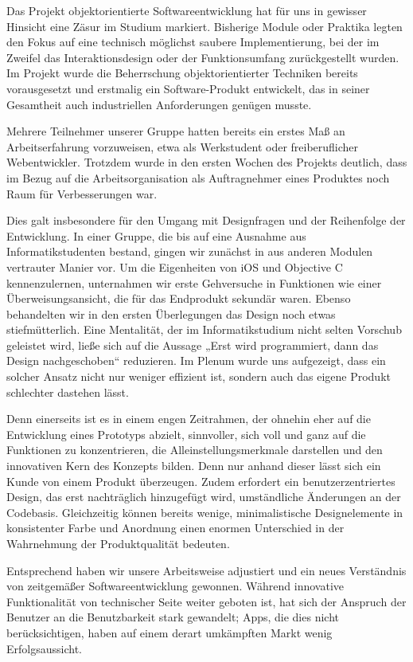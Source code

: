 

Das Projekt objektorientierte Softwareentwicklung hat für uns in gewisser Hinsicht eine Zäsur im Studium markiert. Bisherige Module oder Praktika legten den Fokus auf eine technisch möglichst saubere Implementierung, bei der im Zweifel das Interaktionsdesign oder der Funktionsumfang zurückgestellt wurden. Im Projekt wurde die Beherrschung objektorientierter Techniken bereits vorausgesetzt und erstmalig ein Software-Produkt entwickelt, das in seiner Gesamtheit auch industriellen Anforderungen genügen musste. 

Mehrere Teilnehmer unserer Gruppe hatten bereits ein erstes Maß an Arbeitserfahrung vorzuweisen, etwa als Werkstudent oder freiberuflicher Webentwickler. Trotzdem wurde in den ersten Wochen des Projekts deutlich, dass im Bezug auf die Arbeitsorganisation als Auftragnehmer eines Produktes noch Raum für Verbesserungen war. 

Dies galt insbesondere für den Umgang mit Designfragen und der Reihenfolge der Entwicklung. In einer Gruppe, die bis auf eine Ausnahme aus Informatikstudenten bestand, gingen wir zunächst in aus anderen Modulen vertrauter Manier vor. Um die Eigenheiten von iOS und Objective C kennenzulernen, unternahmen wir erste Gehversuche in Funktionen wie einer Überweisungsansicht, die für das Endprodukt sekundär waren. Ebenso behandelten wir in den ersten Überlegungen das Design noch etwas stiefmütterlich. Eine Mentalität, der im Informatikstudium nicht selten Vorschub geleistet wird, ließe sich auf die Aussage „Erst wird programmiert, dann das Design nachgeschoben“ reduzieren. Im Plenum wurde uns aufgezeigt, dass ein solcher Ansatz nicht nur weniger effizient ist, sondern auch das eigene Produkt schlechter dastehen lässt. 

Denn einerseits ist es in einem engen Zeitrahmen, der ohnehin eher auf die Entwicklung eines Prototyps abzielt, sinnvoller, sich voll und ganz auf die Funktionen zu konzentrieren, die Alleinstellungsmerkmale darstellen und den innovativen Kern des Konzepts bilden. Denn nur anhand dieser lässt sich ein Kunde von einem Produkt überzeugen. Zudem erfordert ein benutzerzentriertes Design, das erst nachträglich hinzugefügt wird, umständliche Änderungen an der Codebasis. Gleichzeitig können bereits wenige, minimalistische Designelemente in konsistenter Farbe und Anordnung einen enormen Unterschied in der Wahrnehmung der Produktqualität bedeuten.

Entsprechend haben wir unsere Arbeitsweise adjustiert und ein neues Verständnis von zeitgemäßer Softwareentwicklung gewonnen. Während innovative Funktionalität von technischer Seite weiter geboten ist, hat sich der Anspruch der Benutzer an die Benutzbarkeit stark gewandelt; Apps, die dies nicht berücksichtigen, haben auf einem derart umkämpften Markt wenig Erfolgsaussicht.

